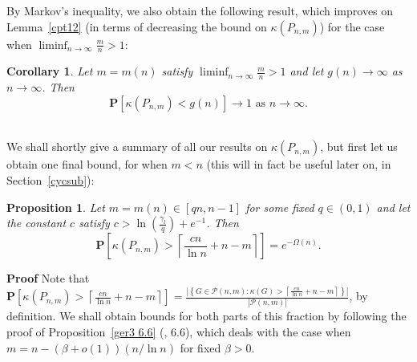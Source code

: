 \documentclass{article}
\newtheorem{Corollary}[Theorem]{Corollary}
\newtheorem{Proposition}[Theorem]{Proposition}
\newtheorem{Proof of Theorem}{Proof of Theorem}
\begin{document}
By Markov's inequality,
we also obtain the following result,
which improves on Lemma~\ref{cpt12} 
(in terms of decreasing the bound on $\kappa(P_{n,m})$)
for the case when $\liminf_{n \to \infty} \frac{m}{n} > 1$:















\begin{Corollary} \label{cpt203}
Let $m=m(n)$ satisfy $\liminf_{n \to \infty} \frac{m}{n} > 1$
and let $g(n) \to \infty$ as~$n \to \infty$.
Then
\begin{displaymath}
\mathbf{P}[\kappa (P_{n,m}) < g(n)] \to 1 \textrm{ as } n \to \infty.
\end{displaymath} \\
\end{Corollary} 















We shall shortly give a summary of all our results on $\kappa(P_{n,m})$,
but first let us obtain one final bound,
for when $m<n$
(this will in fact be useful later on,
in Section~\ref{cycsub}):















\begin{Proposition} \label{cpt31}
Let $m=m(n) \in [qn,n-1]$ for some fixed $q \in (0,1)$
and let the constant $c$ satisfy $c> \ln \left( \frac{\gamma _{l}}{q} \right) + e^{-1}$.
Then
\begin{displaymath}
\mathbf{P} \left[ \kappa (P_{n,m}) > \left \lceil \frac{cn}{\ln n} + n-m \right \rceil \right] = e^{- \Omega(n)}.
\end{displaymath}
\end{Proposition}
\textbf{Proof}
Note that
$\mathbf{P} \left[ \kappa (P_{n,m}) > \left \lceil \frac{cn}{\ln n} \!+\! n\!-\!m \right \rceil \right]
= \frac { \left | \left \{ G \in \mathcal{P}(n,m):
\kappa(G)> \left \lceil \frac{cn}{\ln n} + n-m \right \rceil \right \} \right|}{|\mathcal{P}(n,m)|}$,
by definition.
We shall obtain bounds for both parts of this fraction by following
the proof of Proposition~\ref{ger3 6.6} (\cite{ger3}, 6.6),
which deals with the case when \mbox{$m= n-(\beta + o(1))(n/ \ln n)$} for fixed $\beta >0$.
\end{document}
